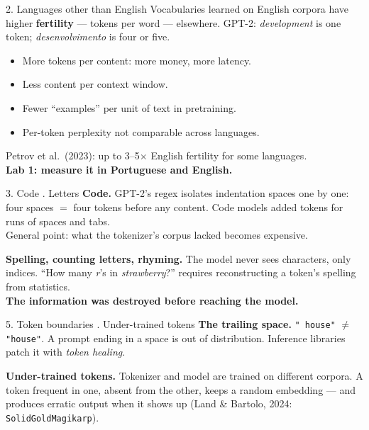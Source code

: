 \documentclass[11pt,aspectratio=169]{beamer}
\newcommand{\dest}[1]{\textcolor{structure}{\textbf{#1}}}
\begin{document}
\begin{frame}{2. Languages other than English}
  Vocabularies learned on English corpora have higher \dest{fertility} --- tokens per word
  --- elsewhere. GPT-2: \emph{development} is one token; \emph{desenvolvimento} is four or
  five.

  \vspace{0.8em}
  \begin{itemize}
    \item More tokens per content: more money, more latency.
    \item Less content per context window.
    \item Fewer ``examples'' per unit of text in pretraining.
    \item Per-token perplexity not comparable across languages.
  \end{itemize}

  \vspace{0.6em}
  Petrov et al.\ (2023): up to 3--5$\times$ English fertility for some languages.\\
  \textbf{Lab 1: measure it in Portuguese and English.}
\end{frame}

\begin{frame}{3. Code . Letters}
  \dest{Code.} GPT-2's regex isolates indentation spaces one by one: four spaces $=$ four
  tokens before any content. Code models added tokens for runs of spaces and tabs.\\
  General point: what the tokenizer's corpus lacked becomes expensive.

  \vspace{1.2em}
  \dest{Spelling, counting letters, rhyming.} The model never sees characters, only
  indices. ``How many \emph{r}'s in \emph{strawberry}?'' requires reconstructing a token's
  spelling from statistics.\\
  \textbf{The information was destroyed before reaching the model.}
\end{frame}

\begin{frame}{5. Token boundaries . Under-trained tokens}
  \dest{The trailing space.} \texttt{" house"} $\neq$ \texttt{"house"}. A prompt ending in a
  space is out of distribution. Inference libraries patch it with \emph{token healing}.

  \vspace{1.2em}
  \dest{Under-trained tokens.} Tokenizer and model are trained on different corpora. A token
  frequent in one, absent from the other, keeps a random embedding --- and produces erratic
  output when it shows up (Land \& Bartolo, 2024: \texttt{SolidGoldMagikarp}).
\end{frame}
\end{document}
